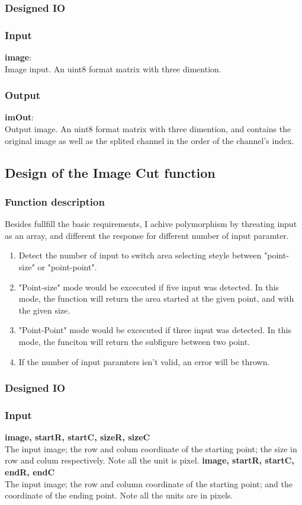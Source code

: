 \documentclass[a4paper,11pt]{article}
\begin{document}
\subsubsection{Designed IO}
\subsubsection*{Input}
\textbf{image}: \\
Image input. An uint8 format matrix with three dimention.
\subsubsection*{Output}
\textbf{imOut}: \\
Output image. An uint8 format matrix with three dimention, and contains the original image as well as the splited channel in the order of the channel's index.

\subsection{Design of the Image Cut function}
\subsubsection{Function description}
Besides fullfill the basic requirements, I achive polymorphism by threating input as an array, and different the response for different number of input paramter.
\begin{enumerate}
    \item Detect the number of input to switch area selecting steyle between "point-size" or "point-point". 
    \item "Point-size" mode would be excecuted if five input was detected. In this mode, the function will return the area started at the given point, and with the given size.
    \item "Point-Point" mode would be excecuted if three input was detected. In this mode, the funciton will return the subfigure between two point.
    \item If the number of input paramters isn't valid, an error will be thrown.
\end{enumerate}
\subsubsection{Designed IO}
\subsubsection*{Input}
\textbf{image, startR, startC, sizeR, sizeC}\\
The input image; the row and colum coordinate of the starting point; the size in row and colum respectively. Note all the unit is pixel.
\textbf{image, startR, startC, endR, endC}\\
The input image; the row and column coordinate of the starting point; and the coordinate of the ending point. Note all the units are in pixels.
\end{document}

